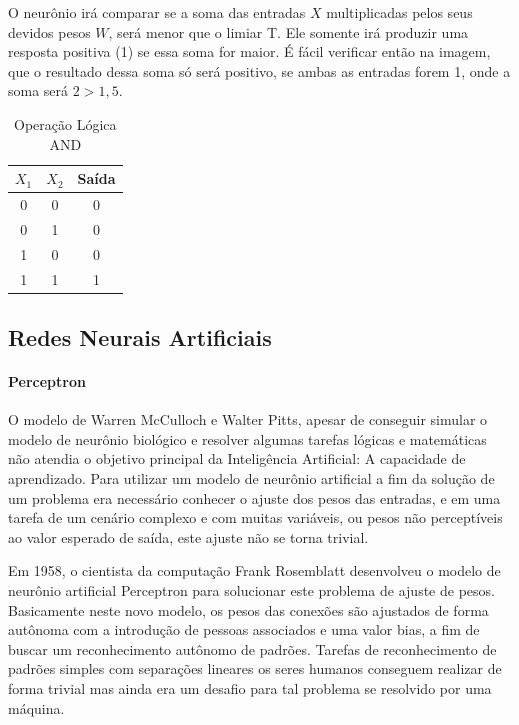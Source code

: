 \documentclass[	12pt, Times, openright, twoside, a4paper, english, brazil]{abntex2}
\begin{document}
           O neurônio irá comparar se a soma das entradas $X$ multiplicadas pelos seus devidos pesos $W$, será menor que o limiar T. Ele somente irá produzir uma resposta positiva (1) se essa soma for maior. É fácil verificar então na imagem, que o resultado dessa soma só será positivo, se ambas as entradas forem 1, onde a soma será $2>1,5$.

            \begin{table}[!ht]
            \centering
            \caption{Operação Lógica AND} \label{tab:and}
              \begin{tabular}{|c|c|c|}
                  \hline  \textbf{$X_1$} & \textbf{$X_2$} &  \textbf{Saída}\\
                  \hline 0 & 0 & 0\\
                  \hline 0 & 1 & 0\\
                  \hline 1 & 0 & 0\\
                  \hline 1 & 1 & 1\\
                  \hline 
              \end{tabular}
            \end{table}

        \subsection{Redes Neurais Artificiais}
          \paragraph*{Perceptron}
            O modelo de Warren McCulloch e Walter Pitts, apesar de conseguir simular o modelo de neurônio biológico e resolver algumas tarefas lógicas e matemáticas não atendia o objetivo principal da Inteligência Artificial: A capacidade de aprendizado.
            Para utilizar um modelo de neurônio artificial a fim da solução de um problema era necessário conhecer o ajuste dos pesos das entradas, e em uma tarefa de um cenário complexo e com muitas variáveis, ou pesos não perceptíveis ao valor esperado de saída, este ajuste não se torna trivial.
            
            Em 1958, o cientista da computação Frank Rosemblatt desenvolveu o modelo de neurônio artificial Perceptron para solucionar este problema de ajuste de pesos.
            Basicamente neste novo modelo, os pesos das conexões são ajustados de forma autônoma com a introdução de pessoas associados e uma valor bias, a fim de buscar um reconhecimento autônomo de padrões. Tarefas de reconhecimento de padrões simples com separações lineares os seres humanos conseguem realizar de forma trivial mas ainda era um desafio para tal problema se resolvido por uma máquina.
\end{document}
